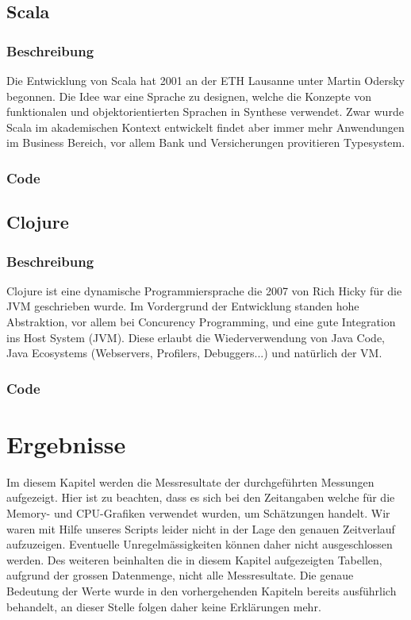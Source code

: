 \documentclass{fancydocument}
\begin{document}


\subsection{Scala}

\subsubsection{Beschreibung}

Die Entwicklung von Scala hat 2001 an der ETH Lausanne unter Martin
Odersky begonnen. Die Idee war eine Sprache zu designen, welche die
Konzepte von funktionalen und objektorientierten Sprachen in Synthese
verwendet. Zwar wurde Scala im akademischen Kontext entwickelt findet
aber immer mehr Anwendungen im Business Bereich, vor allem Bank und
Versicherungen provitieren Typesystem.

\subsubsection{Code}



\subsection{Clojure}
\subsubsection{Beschreibung}

Clojure ist eine dynamische Programmiersprache die 2007 von Rich Hicky
für die JVM geschrieben wurde. Im Vordergrund der Entwicklung standen
hohe Abstraktion, vor allem bei Concurency Programming, und eine gute
Integration ins Host System (JVM). Diese erlaubt die Wiederverwendung von
Java Code, Java Ecosystems (Webservers, Profilers, Debuggers...) und natürlich der VM.

\subsubsection{Code}


\section{Ergebnisse}
Im diesem Kapitel werden die Messresultate der durchgeführten Messungen aufgezeigt. Hier ist zu beachten, dass es sich bei den Zeitangaben welche für die Memory- und CPU-Grafiken verwendet wurden, um Schätzungen handelt. Wir waren mit Hilfe unseres Scripts leider nicht in der Lage den genauen Zeitverlauf aufzuzeigen. Eventuelle Unregelmässigkeiten können daher nicht ausgeschlossen werden. Des weiteren beinhalten die in diesem Kapitel aufgezeigten Tabellen, aufgrund der grossen Datenmenge, nicht alle Messresultate. Die genaue Bedeutung der Werte wurde in den vorhergehenden Kapiteln bereits ausführlich behandelt, an dieser Stelle folgen daher keine Erklärungen mehr.
\end{document}
